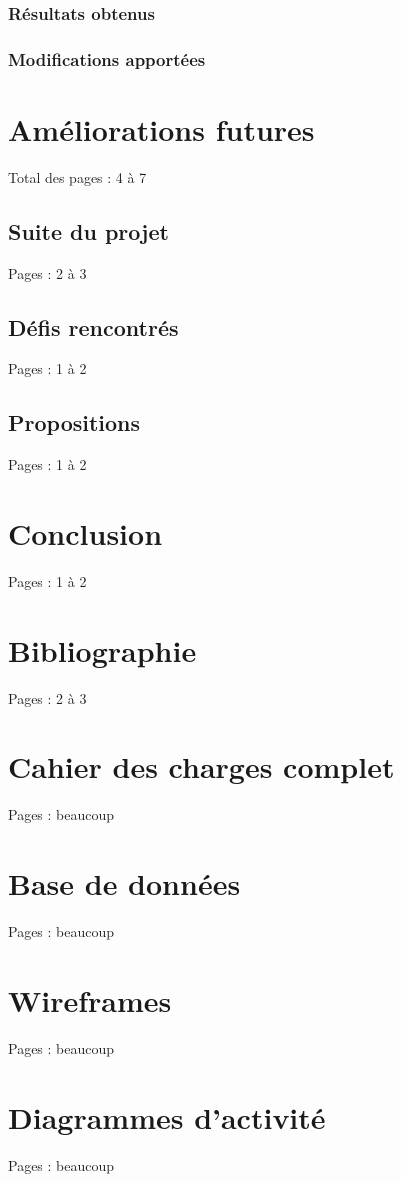\documentclass{eplmastersthesis_FR}
\begin{document}
			\subsection*{Résultats obtenus}
			\subsection*{Modifications apportées}

	\chapter{Améliorations futures}

		Total des pages : 4 à 7

		\section{Suite du projet}

			Pages : 2 à 3

		\section{Défis rencontrés}

			Pages : 1 à 2

		\section{Propositions}

			Pages : 1 à 2

	\chapter{Conclusion}

		Pages : 1 à 2

	\chapter*{Bibliographie}

		Pages : 2 à 3

	\appendix

	\chapter{Cahier des charges complet}

		Pages : beaucoup

	\chapter{Base de données}

		Pages : beaucoup

	\chapter{Wireframes}

		Pages : beaucoup

	\chapter{Diagrammes d'activité}

		Pages : beaucoup

	\backcoverpage
\end{document}
